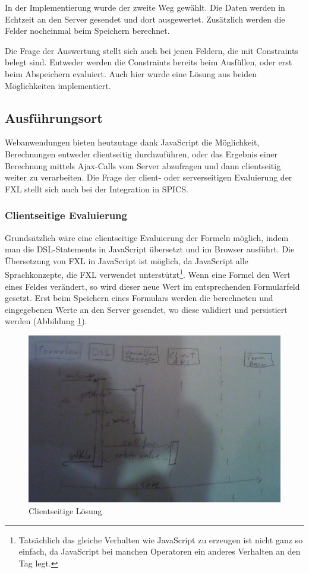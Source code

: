 In der Implementierung wurde der zweite Weg gewählt. Die Daten werden in Echtzeit an den Server gesendet und dort ausgewertet. Zusätzlich werden die Felder nocheinmal beim Speichern berechnet.

Die Frage der Auswertung stellt sich auch bei jenen Feldern, die mit Constraints belegt sind. Entweder werden die Constraints bereits beim Ausfüllen, oder erst beim Abspeichern evaluiert. Auch hier wurde eine Lösung aus beiden Möglichkeiten implementiert. 


\subsection{Ausführungsort}
\label{integration_ausfuehrungsort}

Webanwendungen bieten heutzutage dank JavaScript die Möglichkeit, Berechnungen entweder clientseitig durchzuführen, oder das Ergebnis einer Berechnung mittels Ajax-Calls vom Server abzufragen und dann clientseitig weiter zu verarbeiten. Die Frage der client- oder serverseitigen Evaluierung der FXL stellt sich auch bei der Integration in SPICS.

\subsubsection{Clientseitige Evaluierung}

Grundsätzlich wäre eine clientseitige Evaluierung der Formeln möglich, indem man die DSL-Statements in JavaScript übersetzt und im Browser ausführt. Die Übersetzung von FXL in JavaScript ist möglich, da JavaScript alle Sprachkonzepte, die FXL verwendet unterstützt\footnote{Tatsächlich das gleiche Verhalten wie JavaScript zu erzeugen ist nicht ganz so einfach, da JavaScript bei manchen Operatoren ein anderes Verhalten an den Tag legt.}. Wenn eine Formel den Wert eines Feldes verändert, so wird dieser neue Wert im entsprechenden Formularfeld gesetzt. Erst beim Speichern eines Formulars werden die berechneten und eingegebenen Werte an den Server gesendet, wo diese validiert und persistiert werden (Abbildung \ref{abb_uml_seq_client}).

\begin{figure}[th]
\includegraphics[scale=0.3]{figures/uml_seq_client}
\caption{Clientseitige Lösung}
\label{abb_uml_seq_client}
\end{figure}



